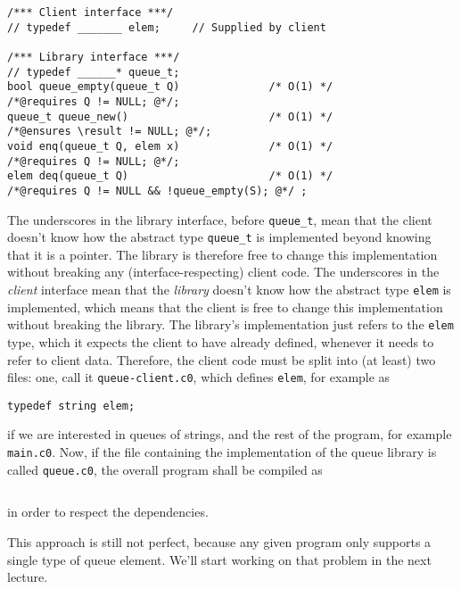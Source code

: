\begin{lstlisting}[language={[C0]C}]
/*** Client interface ***/
// typedef _______ elem;     // Supplied by client

/*** Library interface ***/
// typedef ______* queue_t;
bool queue_empty(queue_t Q)              /* O(1) */
/*@requires Q != NULL; @*/;
queue_t queue_new()                      /* O(1) */
/*@ensures \result != NULL; @*/;
void enq(queue_t Q, elem x)              /* O(1) */
/*@requires Q != NULL; @*/;
elem deq(queue_t Q)                      /* O(1) */
/*@requires Q != NULL && !queue_empty(S); @*/ ;
\end{lstlisting}
The underscores in the library interface, before \lstinline'queue_t',
mean that the client doesn't know how the abstract type
\lstinline'queue_t' is implemented beyond knowing that it is a
pointer.  The library is therefore free to change this implementation
without breaking any (interface-respecting) client code. The
underscores in the \emph{client} interface mean that the
\emph{library} doesn't know how the abstract type \lstinline'elem' is
implemented, which means that the client is free to change this
implementation without breaking the library. The library's
implementation just refers to the \lstinline'elem' type, which it
expects the client to have already defined, whenever it needs to refer
to client data.  Therefore, the client code must be split into (at
least) two files: one, call it \lstinline'queue-client.c0', which
defines \lstinline'elem', for example as
\begin{lstlisting}[language={[C0]C}]
typedef string elem;
\end{lstlisting}
if we are interested in queues of strings, and the rest of the
program, for example \lstinline'main.c0'.  Now, if the file containing
the implementation of the queue library is called
\lstinline'queue.c0', the overall program shall be compiled as

\begin{lstlisting}[language={[coin]C}]
% cc0 queue-client.c0 queue.c0 main.c0
\end{lstlisting}
in order to respect the dependencies.

This approach is still not perfect, because any given program only
supports a single type of queue element. We'll start working on that
problem in the next lecture.



